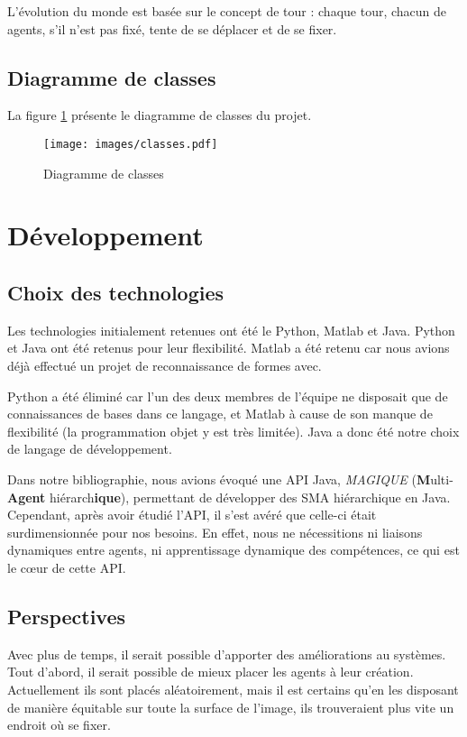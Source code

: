 \documentclass[a4paper,12pt]{report}
\begin{document}
L'évolution du monde est basée sur le concept de tour : chaque tour, chacun de agents, s'il n'est pas fixé, tente de se déplacer et de se fixer.

\section{Diagramme de classes}
La figure \ref{fig:dc} présente le diagramme de classes du projet.
\begin{figure}
 \texttt{[image: images/classes.pdf]}
 \caption{Diagramme de classes}
 \label{fig:dc}
\end{figure}


\chapter{Développement}
\section{Choix des technologies}
Les technologies initialement retenues ont été le Python, Matlab et Java. Python et Java ont été retenus pour leur flexibilité. Matlab a été retenu car nous avions déjà effectué un projet de reconnaissance de formes avec.

Python a été éliminé car l'un des deux membres de l'équipe ne disposait que de connaissances de bases dans ce langage, et Matlab à cause de son manque de flexibilité (la programmation objet y est très limitée). Java a donc été notre choix de langage de développement.

Dans notre bibliographie, nous avions évoqué une API Java, \emph{MAGIQUE} (\textbf{M}ulti-\textbf{Agent} hiérarch\textbf{ique}), permettant de développer des SMA hiérarchique en Java. Cependant, après avoir étudié l'API, il s'est avéré que celle-ci était surdimensionnée pour nos besoins. En effet, nous ne nécessitions ni liaisons dynamiques entre agents, ni apprentissage dynamique des compétences, ce qui est le cœur de cette API. 

\section{Perspectives}
Avec plus de temps, il serait possible d'apporter des améliorations au systèmes. Tout d'abord, il serait possible de mieux placer les agents à leur création. Actuellement ils sont placés aléatoirement, mais il est certains qu'en les disposant de manière \og{}équitable\fg{} sur toute la surface de l'image, ils trouveraient plus vite un endroit où se fixer.
\end{document}
